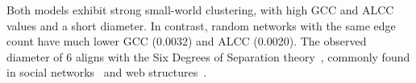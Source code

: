 Both models exhibit strong small-world clustering, with high GCC and ALCC values and a short diameter. In contrast, random networks with the same edge count have much lower GCC (0.0032) and ALCC (0.0020). The observed diameter of 6 aligns with the Six Degrees of Separation theory~\cite{Milgram1967small}, commonly found in social networks~\cite{Watts1998collective} and web structures~\cite{Albert1999internet}.





